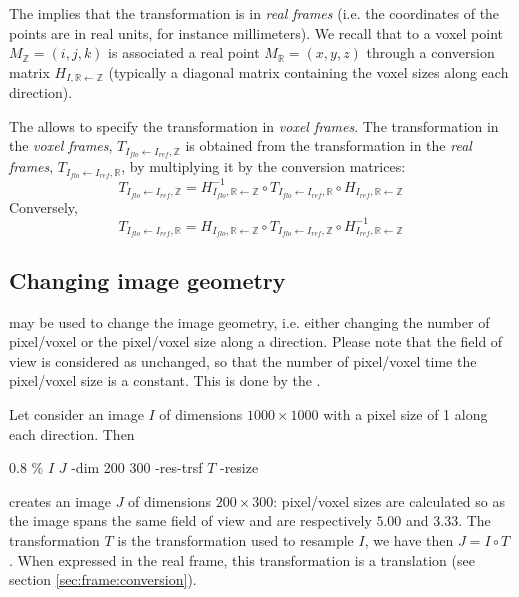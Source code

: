 The  implies that the transformation is in \textit{real frames} (i.e. the coordinates of the points are in real units, for instance millimeters). We recall that to a voxel point $M_{\mathbb{Z}} = (i,j,k)$ is associated a real point $M_{\mathbb{R}} = (x,y,z)$ through a conversion matrix $H_{I,\mathbb{R} \leftarrow \mathbb{Z}}$ (typically a diagonal matrix containing the voxel sizes along each direction).

The  allows to specify the transformation in \textit{voxel frames}. The transformation in the \textit{voxel frames}, $T_{I_{flo} \leftarrow I_{ref}, \mathbb{Z}}$ is obtained from the transformation in the \textit{real frames}, $T_{I_{flo} \leftarrow I_{ref}, \mathbb{R}}$, by multiplying it by the conversion matrices:
$$
T_{I_{flo} \leftarrow I_{ref}, \mathbb{Z}} 
=
H^{-1}_{I_{flo},\mathbb{R} \leftarrow \mathbb{Z}} \circ
T_{I_{flo} \leftarrow I_{ref}, \mathbb{R}} \circ
H_{I_{ref},\mathbb{R} \leftarrow \mathbb{Z}}
$$
Conversely,
$$
T_{I_{flo} \leftarrow I_{ref}, \mathbb{R}} 
=
H_{I_{flo},\mathbb{R} \leftarrow \mathbb{Z}} \circ
T_{I_{flo} \leftarrow I_{ref}, \mathbb{Z}} \circ
H^{-1}_{I_{ref},\mathbb{R} \leftarrow \mathbb{Z}}
$$


\subsection{Changing image geometry}
\label{sec:changing:image:geometry}

\applyTrsf may be used to change the image geometry, i.e. either changing the number of pixel/voxel or the pixel/voxel size along a direction. Please note that the field of view is considered as unchanged, so that the number of pixel/voxel time the pixel/voxel size is a constant. This is done by the .

Let consider an image $I$ of dimensions $1000 \times 1000$ with a pixel size of 1 along each direction. Then
\begin{code}{0.8}
\% \applyTrsf $I$ $J$ -dim 200 300 -res-trsf $T$ -resize
\end{code}
creates an image $J$  of dimensions $200 \times 300$: pixel/voxel sizes are calculated so as the image spans the same field of view and are respectively $5.00$ and $3.33$. The transformation $T$ is the transformation used to resample $I$, we have then $J = I \circ T$. When expressed in the real frame, this transformation is a translation (see section \ref{sec:frame:conversion}). 





